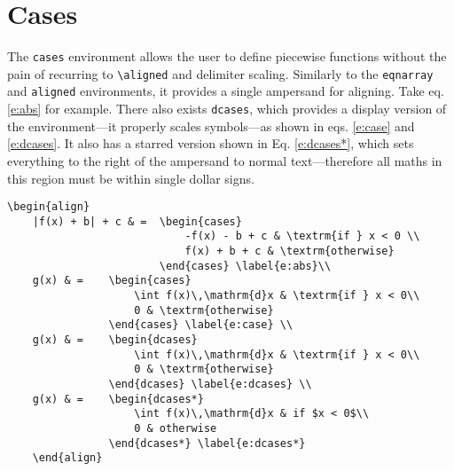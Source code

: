\section{Cases}
%
The \verb|cases| environment allows the user to define piecewise functions without the pain of recurring to \verb|\aligned| and delimiter scaling. Similarly to the \verb|eqnarray| and \verb|aligned| environments, it provides a single ampersand for aligning. Take eq. \eqref{e:abs} for example. There also exists \verb|dcases|, which provides a display version of the environment---it properly scales symbols---as shown in eqs. \eqref{e:case} and \eqref{e:dcases}. It also has a starred version shown in Eq. \eqref{e:dcases*}, which sets everything to the right of the ampersand to normal text---therefore all maths in this region must be within single dollar signs.
\begin{verbatim}
\begin{align}
    |f(x) + b| + c & =  \begin{cases}
                            -f(x) - b + c & \textrm{if } x < 0 \\
                            f(x) + b + c & \textrm{otherwise}
                        \end{cases} \label{e:abs}\\
    g(x) & =    \begin{cases}
                    \int f(x)\,\mathrm{d}x & \textrm{if } x < 0\\
                    0 & \textrm{otherwise}
                \end{cases} \label{e:case} \\
    g(x) & =    \begin{dcases}
                    \int f(x)\,\mathrm{d}x & \textrm{if } x < 0\\
	                0 & \textrm{otherwise}
                \end{dcases} \label{e:dcases} \\
    g(x) & =    \begin{dcases*}
                    \int f(x)\,\mathrm{d}x & if $x < 0$\\
                    0 & otherwise
                \end{dcases*} \label{e:dcases*}             
	\end{align}
\end{verbatim}
